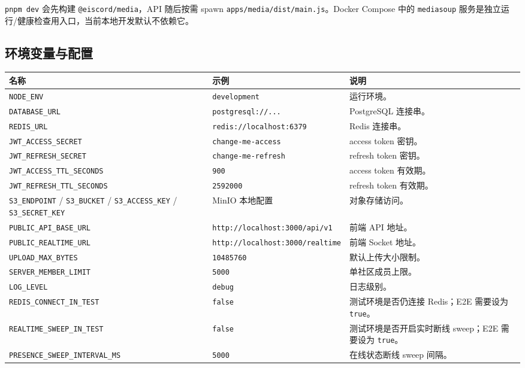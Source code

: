 \texttt{pnpm dev} 会先构建 \texttt{@eiscord/media}，API 随后按需 spawn \texttt{apps/media/dist/main.js}。Docker Compose 中的 \texttt{mediasoup} 服务是独立运行/健康检查用入口，当前本地开发默认不依赖它。

\subsection{环境变量与配置}

\noindent\begin{tabularx}{\textwidth}{L{4.4cm}L{3.4cm}Y}
  \toprule
  名称 & 示例 & 说明 \\
  \midrule
  \texttt{NODE\_ENV} & \texttt{development} & 运行环境。 \\
  \texttt{DATABASE\_URL} & \texttt{postgresql://...} & PostgreSQL 连接串。 \\
  \texttt{REDIS\_URL} & \texttt{redis://localhost:6379} & Redis 连接串。 \\
  \texttt{JWT\_ACCESS\_SECRET} & \texttt{change-me-access} & access token 密钥。 \\
  \texttt{JWT\_REFRESH\_SECRET} & \texttt{change-me-refresh} & refresh token 密钥。 \\
  \texttt{JWT\_ACCESS\_TTL\_SECONDS} & \texttt{900} & access token 有效期。 \\
  \texttt{JWT\_REFRESH\_TTL\_SECONDS} & \texttt{2592000} & refresh token 有效期。 \\
  \texttt{S3\_ENDPOINT} / \texttt{S3\_BUCKET} / \texttt{S3\_ACCESS\_KEY} / \texttt{S3\_SECRET\_KEY} & MinIO 本地配置 & 对象存储访问。 \\
  \texttt{PUBLIC\_API\_BASE\_URL} & \texttt{http://localhost:3000/api/v1} & 前端 API 地址。 \\
  \texttt{PUBLIC\_REALTIME\_URL} & \texttt{http://localhost:3000/realtime} & 前端 Socket 地址。 \\
  \texttt{UPLOAD\_MAX\_BYTES} & \texttt{10485760} & 默认上传大小限制。 \\
  \texttt{SERVER\_MEMBER\_LIMIT} & \texttt{5000} & 单社区成员上限。 \\
  \texttt{LOG\_LEVEL} & \texttt{debug} & 日志级别。 \\
  \texttt{REDIS\_CONNECT\_IN\_TEST} & \texttt{false} & 测试环境是否仍连接 Redis；E2E 需要设为 \texttt{true}。 \\
  \texttt{REALTIME\_SWEEP\_IN\_TEST} & \texttt{false} & 测试环境是否开启实时断线 sweep；E2E 需要设为 \texttt{true}。 \\
  \texttt{PRESENCE\_SWEEP\_INTERVAL\_MS} & \texttt{5000} & 在线状态断线 sweep 间隔。 \\

\end{tabularx}
